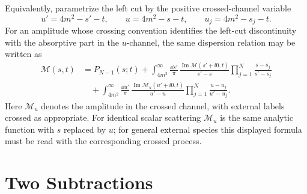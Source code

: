 Equivalently, parametrize the left cut by the positive crossed-channel
variable
\[
  u'=4m^2-s'-t,\qquad u=4m^2-s-t,\qquad
  u_j=4m^2-s_j-t .
\]
For an amplitude whose crossing convention identifies the left-cut
discontinuity with the absorptive part in the \(u\)-channel, the same
dispersion relation may be written as
\[
\begin{aligned}
  \mathcal M(s,t)
  &=
  P_{N-1}(s;t)
  +
  \int_{4m^2}^{\infty}
  \frac{\dd s'}{\pi}\,
  \frac{\operatorname{Im}\mathcal M(s'+\ii0,t)}{s'-s}
  \prod_{j=1}^N\frac{s-s_j}{s'-s_j}
\\
  &\quad
  +
  \int_{4m^2}^{\infty}
  \frac{\dd u'}{\pi}\,
  \frac{\operatorname{Im}\mathcal M_u(u'+\ii0,t)}{u'-u}
  \prod_{j=1}^N\frac{u-u_j}{u'-u_j}.
\end{aligned}
\]
Here \(\mathcal M_u\) denotes the amplitude in the crossed channel, with
external labels crossed as appropriate.  For identical scalar scattering
\(\mathcal M_u\) is the same analytic function with \(s\) replaced by \(u\);
for general external species this displayed formula must be read with the
corresponding crossed process.

\section{Two Subtractions}

